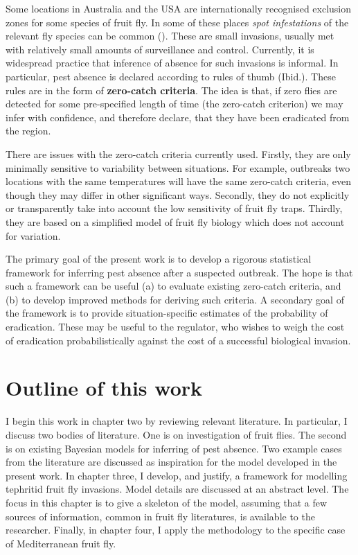 \documentclass[
  oneside]{book}
\begin{document}
Some locations in Australia and the USA are internationally recognised exclusion zones for some species of fruit fly. In some of these places \emph{spot infestations} of the relevant fly species can be common (\citet{meats2005}). These are small invasions, usually met with relatively small amounts of surveillance and control. Currently, it is widespread practice that inference of absence for such invasions is informal. In particular, pest absence is declared according to rules of thumb (Ibid.). These rules are in the form of \textbf{zero-catch criteria}. The idea is that, if zero flies are detected for some pre-specified length of time (the zero-catch criterion) we may infer with confidence, and therefore declare, that they have been eradicated from the region.

There are issues with the zero-catch criteria currently used. Firstly, they are only minimally sensitive to variability between situations. For example, outbreaks two locations with the same temperatures will have the same zero-catch criteria, even though they may differ in other significant ways. Secondly, they do not explicitly or transparently take into account the low sensitivity of fruit fly traps. Thirdly, they are based on a simplified model of fruit fly biology which does not account for variation.

The primary goal of the present work is to develop a rigorous statistical framework for inferring pest absence after a suspected outbreak. The hope is that such a framework can be useful (a) to evaluate existing zero-catch criteria, and (b) to develop improved methods for deriving such criteria. A secondary goal of the framework is to provide situation-specific estimates of the probability of eradication. These may be useful to the regulator, who wishes to weigh the cost of eradication probabilistically against the cost of a successful biological invasion.

\hypertarget{outline-of-this-work}{%
\section{Outline of this work}\label{outline-of-this-work}}

I begin this work in chapter two by reviewing relevant literature. In particular, I discuss two bodies of literature. One is on investigation of fruit flies. The second is on existing Bayesian models for inferring of pest absence. Two example cases from the literature are discussed as inspiration for the model developed in the present work. In chapter three, I develop, and justify, a framework for modelling tephritid fruit fly invasions. Model details are discussed at an abstract level. The focus in this chapter is to give a skeleton of the model, assuming that a few sources of information, common in fruit fly literatures, is available to the researcher. Finally, in chapter four, I apply the methodology to the specific case of Mediterranean fruit fly.
\end{document}
